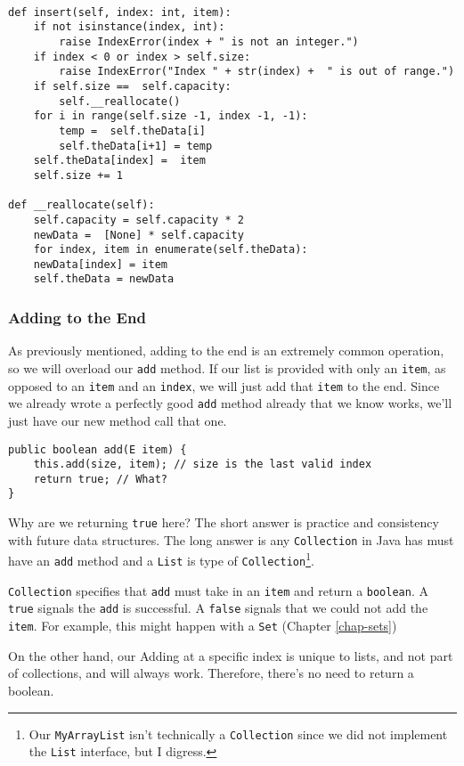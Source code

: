 \begin{verbatim}
	
def insert(self, index: int, item):
	if not isinstance(index, int):
		raise IndexError(index + " is not an integer.")
	if index < 0 or index > self.size:
		raise IndexError("Index " + str(index) +  " is out of range.")
	if self.size ==  self.capacity:
		self.__reallocate()
	for i in range(self.size -1, index -1, -1):
		temp =  self.theData[i]
		self.theData[i+1] = temp
	self.theData[index] =  item
	self.size += 1
	
def __reallocate(self):
	self.capacity = self.capacity * 2
	newData =  [None] * self.capacity
	for index, item in enumerate(self.theData):
	newData[index] = item
	self.theData = newData
\end{verbatim}


\subsubsection{Adding to the End}

As previously  mentioned, adding to the end is an extremely common operation, so we will overload our \texttt{add} method.
If our list is provided with only an \texttt{item}, as opposed to an \texttt{item} and an \texttt{index}, we will just add that \texttt{item} to the end.
Since we already wrote a perfectly good \texttt{add} method already that we know works, we'll just have our new method call that one.
\begin{verbatim}
public boolean add(E item) {
	this.add(size, item); // size is the last valid index
	return true; // What?
}
\end{verbatim}

Why are we returning \texttt{true} here?
The short answer is practice and consistency with future data structures.
The long answer is any \texttt{Collection} in Java has must have an \texttt{add} method and a \texttt{List} is type of \texttt{Collection}\footnote{Our \texttt{MyArrayList} isn't technically a \texttt{Collection} since we did not implement the \texttt{List} interface, but I digress.}.

\texttt{Collection} specifies that \texttt{add} must take in an \texttt{item} and return a \texttt{boolean}.
A \texttt{true} signals the \texttt{add} is successful.
A \texttt{false} signals that we could not add the \texttt{item}.
For example, this might happen with a \texttt{Set} (Chapter \ref{chap-sets})


On the other hand, our Adding at a specific index is unique to lists, and not part of collections,  and will always work. Therefore, there's no need to return a boolean. 


